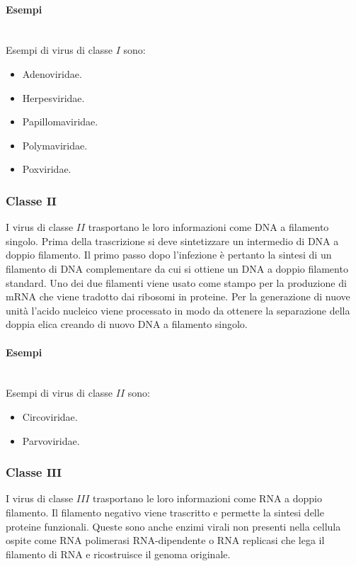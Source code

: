 			\paragraph{Esempi}\mbox{}\\
			Esempi di virus di classe $I$ sono:
			\begin{multicols}{3}
				\begin{itemize}
					\item Adenoviridae.
					\item Herpesviridae.
					\item Papillomaviridae.
					\item Polymaviridae.
					\item Poxviridae.
				\end{itemize}
			\end{multicols}

		\subsubsection{Classe $\mathbf{II}$}
		I virus di classe $II$ trasportano le loro informazioni come DNA a filamento singolo.
		Prima della trascrizione si deve sintetizzare un intermedio di DNA a doppio filamento.
		Il primo passo dopo l'infezione \`e pertanto la sintesi di un filamento di DNA complementare da cui si ottiene un DNA a doppio filamento standard.
		Uno dei due filamenti viene usato come stampo per la produzione di mRNA che viene tradotto dai ribosomi in proteine.
		Per la generazione di nuove unit\`a l'acido nucleico viene processato in modo da ottenere la separazione della doppia elica creando di nuovo DNA a filamento singolo.

			\paragraph{Esempi}\mbox{}\\
			Esempi di virus di classe $II$ sono:
			\begin{multicols}{2}
				\begin{itemize}
					\item Circoviridae.
					\item Parvoviridae.
				\end{itemize}
			\end{multicols}

		\subsubsection{Classe $\mathbf{III}$}
		I virus di classe $III$ trasportano le loro informazioni come RNA a doppio filamento.
		Il filamento negativo viene trascritto e permette la sintesi delle proteine funzionali.
		Queste sono anche enzimi virali non presenti nella cellula ospite come RNA polimerasi RNA-dipendente o RNA replicasi che lega il filamento di RNA e ricostruisce il genoma originale.

